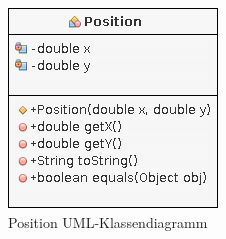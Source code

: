             \begin{figure}[H]
                \centering
                \includegraphics[scale=0.7]{img/uml/position.png}   
                \caption{Position UML-Klassendiagramm}
            \end{figure}